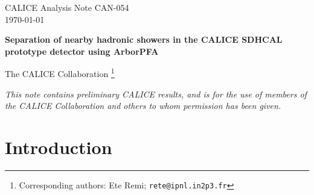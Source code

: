 \documentclass[12pt]{article}
\begin{document}
\linenumbers


\begin{titlepage}
  
  \begin{flushright}
    CALICE Analysis Note CAN-054\\
              \today\\
  \end{flushright}
  \bigskip\bigskip\bigskip\bigskip\bigskip
  \begin{center}
  \huge \bf 
  Separation of nearby hadronic showers in the CALICE SDHCAL prototype detector using ArborPFA

  \end{center}\bigskip\bigskip 
  \begin{center}{
  {\LARGE The CALICE Collaboration}
  \footnote{Corresponding authors: Ete Remi; {\tt rete@ipnl.in2p3.fr} }}
  \end{center}\bigskip\bigskip
  \bigskip

  \begin{abstract}
    A new reconstruction algorithm, ArborPFA, is being developed to separate nearby hadronic showers in the SDHCAL prototype. This intends to demonstrate the capability of high granularity hadronic calorimeters such as the SDHCAL to efficiently apply Particle Flow Algorithms. The reconstruction algorithm we present here uses the tree-like structure features of hadronic showers, that high granular calorimeters reveal, to associate hits belonging to each hadronic shower and to reduce confusions between two close-by showers. The results of these studies indicate a good single particle efficiency and reconstructed energy. A powerful separation down to distances of 5 cm is obtained.
  \end{abstract}

  \bigskip
  \begin{center}
    \vspace{2cm}
    {\sl This note contains preliminary CALICE results, and is for the use
    of members of the CALICE Collaboration and others to whom permission
    has been given.}
  \end{center}
  
\end{titlepage}

\tableofcontents 

\section{Introduction}
\end{document}
